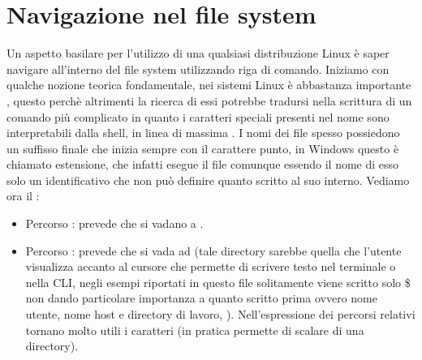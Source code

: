 \section{Navigazione nel file system}
\label{sec:Navigazione-nel-file-system}
Un aspetto basilare per l'utilizzo di una qualsiasi distribuzione Linux è saper navigare all'interno del file system utilizzando riga di comando. Iniziamo con qualche nozione teorica fondamentale, nei sistemi Linux è abbastanza importante , questo perchè altrimenti la ricerca di essi potrebbe tradursi nella scrittura di un comando più complicato in quanto i caratteri speciali presenti nel nome sono interpretabili dalla shell, in linea di massima . I nomi dei file spesso possiedono un suffisso finale che inizia sempre con il carattere punto, in Windows questo è chiamato estensione,  che infatti esegue il file comunque essendo il nome di esso solo un identificativo che non può definire quanto scritto al suo interno. Vediamo ora il :
\begin{itemize}
    \item Percorso : prevede che si vadano a .
    \item Percorso : prevede che si vada ad  (tale directory sarebbe quella che l'utente visualizza accanto al cursore che permette di scrivere testo nel terminale o nella CLI, negli esempi riportati in questo file solitamente viene scritto solo \$ non dando particolare importanza a quanto scritto prima ovvero nome utente, nome host e directory di lavoro, ). Nell'espressione dei percorsi relativi tornano molto utili i caratteri  (in pratica permette di scalare di una directory). 
\end{itemize}
